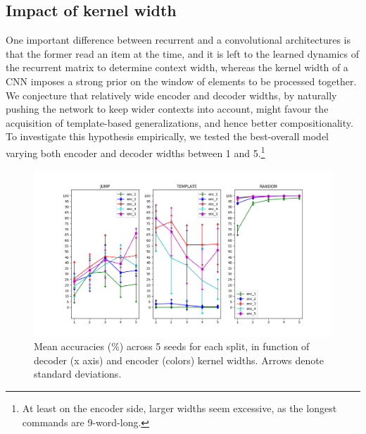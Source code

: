 \subsection{Impact of kernel width}
\label{subsec:exp2}

One important difference between recurrent and a convolutional
architectures is that the former read an item at the time, and it is
left to the learned dynamics of the recurrent matrix to determine
context width, whereas the kernel width of a CNN imposes a strong
prior on the window of elements to be processed together. We
conjecture that relatively wide encoder and decoder widths, by
naturally pushing the network to keep wider contexts into account,
might favour the acquisition of template-based generalizations, and
hence better compositionality. To investigate this hypothesis
empirically, we tested the best-overall model varying both encoder and
decoder widths between 1 and 5.\footnote{At least on the encoder side,
  larger widths seem excessive, as the longest commands are
  9-word-long.}




\begin{figure}[h]
    \centering
    \includegraphics[width=.5\textwidth,keepaspectratio]{figures/kernel_exp.png}
    \caption{Mean accuracies (\%) across 5 seeds for each split, in function of decoder (x axis) and encoder (colors) kernel widths. Arrows denote standard deviations.}
    \label{fig:kernel_exp}
\end{figure}

